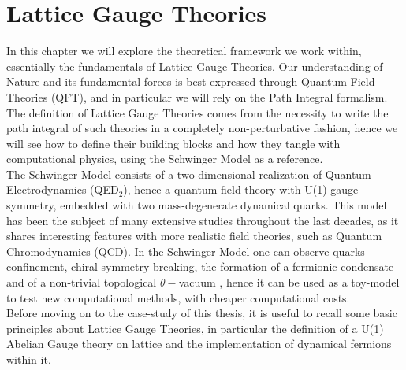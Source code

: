 \chapter{Lattice Gauge Theories}
\label{chap:intro}
In this chapter we will explore the theoretical framework we work within, essentially the fundamentals of Lattice Gauge Theories. Our understanding of Nature and its fundamental forces is best expressed through Quantum Field Theories (QFT), and in particular we will rely on the Path Integral formalism. The definition of Lattice Gauge Theories comes from the necessity to write the path integral of such theories in a completely non-perturbative fashion, hence we will see how to define their building blocks and how they tangle with computational physics, using the Schwinger Model as a reference.
\\ The Schwinger Model \cite{Schwinger:1962tp} consists of a two-dimensional realization of Quantum Electrodynamics (QED$_2$), hence a quantum field theory with U(1) gauge symmetry, embedded with two mass-degenerate dynamical quarks. This model has been the subject of many extensive studies throughout the last decades, as it shares interesting features with more realistic field theories, such as Quantum Chromodynamics (QCD). In the Schwinger Model one can observe quarks confinement, chiral symmetry breaking, the formation of a fermionic condensate and of a non-trivial topological $\theta-$vacuum \cite{COLEMAN1975267, COLEMAN1976239}, hence it can be used as a toy-model to test new computational methods, with cheaper computational costs.
\\ Before moving on to the case-study of this thesis, it is useful to recall some basic principles about Lattice Gauge Theories, in particular the definition of a U(1) Abelian Gauge theory on lattice and the implementation of dynamical fermions within it.

